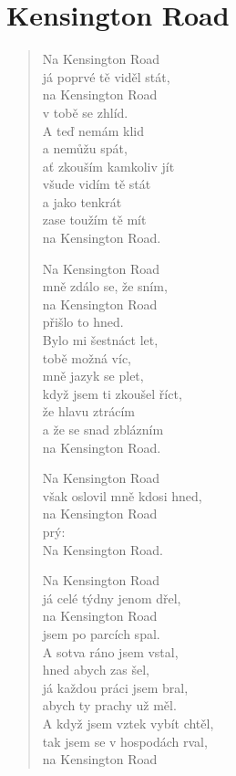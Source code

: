 \section{Kensington Road}

\thispagestyle{empty}

\begin{multicols}{2}


\begin{verse}

Na Kensington Road\\
já poprvé tě viděl stát,\\
na Kensington Road\\
v tobě se zhlíd.\\
A teď nemám klid\\
a nemůžu spát,\\
ať zkouším kamkoliv jít\\
všude vidím tě stát\\
a jako tenkrát\\
zase toužím tě mít\\
na Kensington Road.

Na Kensington Road\\
mně zdálo se, že sním,\\
na Kensington Road\\
přišlo to hned.\\
Bylo mi šestnáct let,\\
tobě možná víc,\\
mně jazyk se plet,\\
když jsem ti zkoušel říct,\\
že hlavu ztrácím\\
a že se snad zblázním\\
na Kensington Road.

Na Kensington Road\\
však oslovil mně kdosi hned,\\
na Kensington Road\\
prý: \\
Na Kensington Road.

Na Kensington Road\\
já celé týdny jenom dřel,\\
na Kensington Road\\
jsem po parcích spal.\\
A sotva ráno jsem vstal,\\
hned abych zas šel,\\
já každou práci jsem bral,\\
abych ty prachy už měl.\\
A když jsem vztek vybít chtěl,\\
tak jsem se v hospodách rval,\\
na Kensington Road


\end{verse}
\end{multicols}
